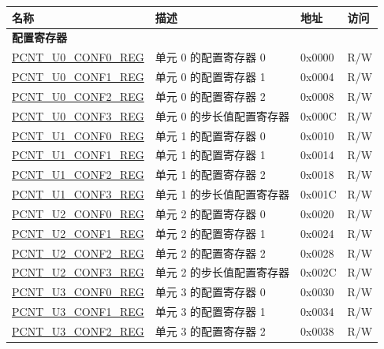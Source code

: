 \begin{longtable}{ | p{6cm} | p{7.2cm} | p{1.3cm} | p{1cm} | }
    \hline\rowcolor{lightgray}
    \textbf{名称} & \textbf{描述} &  \textbf{地址} & \textbf{访问} \\ \hline
    \endhead
    \multicolumn{4}{|l|}{\textbf{配置寄存器}} \\ \hline
    \hyperref[regdesc:PCNTUNCONF0REG]{PCNT\_U0\_CONF0\_REG} & 单元 0 的配置寄存器 0 & 0x0000 & R/W \\ \hline
    \hyperref[regdesc:PCNTUNCONF1REG]{PCNT\_U0\_CONF1\_REG} & 单元 0 的配置寄存器 1 & 0x0004 & R/W \\ \hline
    \hyperref[regdesc:PCNTUNCONF2REG]{PCNT\_U0\_CONF2\_REG} & 单元 0 的配置寄存器 2 & 0x0008 & R/W \\ \hline
    \hyperref[regdesc:PCNTUNCONF3REG]{PCNT\_U0\_CONF3\_REG} & 单元 0 的步长值配置寄存器 & 0x000C & R/W \\ \hline
    \hyperref[regdesc:PCNTUNCONF0REG]{PCNT\_U1\_CONF0\_REG} & 单元 1 的配置寄存器 0 & 0x0010 & R/W \\ \hline
    \hyperref[regdesc:PCNTUNCONF1REG]{PCNT\_U1\_CONF1\_REG} & 单元 1 的配置寄存器 1 & 0x0014 & R/W \\ \hline
    \hyperref[regdesc:PCNTUNCONF2REG]{PCNT\_U1\_CONF2\_REG} & 单元 1 的配置寄存器 2 & 0x0018 & R/W \\ \hline
    \hyperref[regdesc:PCNTUNCONF3REG]{PCNT\_U1\_CONF3\_REG} & 单元 1 的步长值配置寄存器 & 0x001C & R/W \\ \hline
    \hyperref[regdesc:PCNTUNCONF0REG]{PCNT\_U2\_CONF0\_REG} & 单元 2 的配置寄存器 0 & 0x0020 & R/W \\ \hline
    \hyperref[regdesc:PCNTUNCONF1REG]{PCNT\_U2\_CONF1\_REG} & 单元 2 的配置寄存器 1 & 0x0024 & R/W \\ \hline
    \hyperref[regdesc:PCNTUNCONF2REG]{PCNT\_U2\_CONF2\_REG} & 单元 2 的配置寄存器 2 & 0x0028 & R/W \\ \hline
    \hyperref[regdesc:PCNTUNCONF3REG]{PCNT\_U2\_CONF3\_REG} & 单元 2 的步长值配置寄存器 & 0x002C & R/W \\ \hline
    \hyperref[regdesc:PCNTUNCONF0REG]{PCNT\_U3\_CONF0\_REG} & 单元 3 的配置寄存器 0 & 0x0030 & R/W \\ \hline
    \hyperref[regdesc:PCNTUNCONF1REG]{PCNT\_U3\_CONF1\_REG} & 单元 3 的配置寄存器 1 & 0x0034 & R/W \\ \hline
    \hyperref[regdesc:PCNTUNCONF2REG]{PCNT\_U3\_CONF2\_REG} & 单元 3 的配置寄存器 2 & 0x0038 & R/W \\ \hline

\end{longtable}
